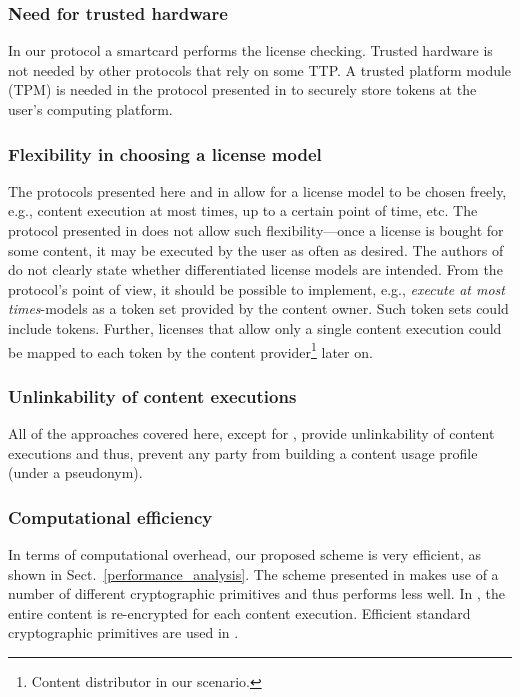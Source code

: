 \documentclass{llncs}
\newcommand{\refSec}[1]{Sect.~\ref{#1}}
\begin{document}
\subsubsection{Need for trusted hardware}

In our protocol a smartcard performs the license checking. Trusted hardware is not needed by other protocols that rely on some TTP. A trusted platform module (TPM) is needed in the protocol presented in \cite{nottp} to securely store tokens at the user's computing platform. 

\subsubsection{Flexibility in choosing a license model}

The protocols presented here and in \cite{proxy, practical} allow for a license model to be chosen freely, e.g., content execution at most  times, up to a certain point of time, etc. The protocol presented in \cite{multilevel} does not allow such flexibility---once a license is bought for some content, it may be executed by the user as often as desired. The authors of \cite{nottp} do not clearly state whether differentiated license models are intended. From the protocol's point of view, it should be possible to implement, e.g., \emph{execute at most}  \emph{times}-models as a token set provided by the content owner. Such token sets could include  tokens. Further, licenses that allow only a single content execution could be mapped to each token by the content provider\footnote{Content distributor in our scenario.} later on.

\subsubsection{Unlinkability of content executions}

All of the approaches covered here, except for \cite{nottp}, provide unlinkability of content executions and thus, prevent any party from building a content usage profile (under a pseudonym).



\subsubsection{Computational efficiency}

In terms of computational overhead, our proposed scheme is very efficient, as shown in \refSec{performance_analysis}. The scheme presented in \cite{practical} makes use of a number of different cryptographic primitives and thus performs less well. In \cite{proxy}, the entire content is re-encrypted for each content execution. Efficient standard cryptographic primitives are used in \cite{multilevel, nottp}. 
\end{document}
